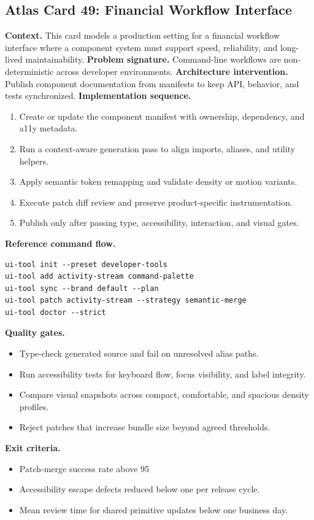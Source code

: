 \subsection*{Atlas Card 49: Financial Workflow Interface}
\textbf{Context.} This card models a production setting for a financial workflow interface where a component system must support speed, reliability, and long-lived maintainability.
\textbf{Problem signature.} Command-line workflows are non-deterministic across developer environments.
\textbf{Architecture intervention.} Publish component documentation from manifests to keep API, behavior, and tests synchronized.
\textbf{Implementation sequence.}
\begin{enumerate}[leftmargin=*, itemsep=0.28em]
  \item Create or update the component manifest with ownership, dependency, and a11y metadata.
  \item Run a context-aware generation pass to align imports, aliases, and utility helpers.
  \item Apply semantic token remapping and validate density or motion variants.
  \item Execute patch diff review and preserve product-specific instrumentation.
  \item Publish only after passing type, accessibility, interaction, and visual gates.
\end{enumerate}
\textbf{Reference command flow.}
\begin{verbatim}
ui-tool init --preset developer-tools
ui-tool add activity-stream command-palette
ui-tool sync --brand default --plan
ui-tool patch activity-stream --strategy semantic-merge
ui-tool doctor --strict
\end{verbatim}
\textbf{Quality gates.}
\begin{itemize}[leftmargin=*, itemsep=0.24em]
  \item Type-check generated source and fail on unresolved alias paths.
  \item Run accessibility tests for keyboard flow, focus visibility, and label integrity.
  \item Compare visual snapshots across compact, comfortable, and spacious density profiles.
  \item Reject patches that increase bundle size beyond agreed thresholds.
\end{itemize}
\textbf{Exit criteria.}
\begin{itemize}[leftmargin=*, itemsep=0.24em]
  \item Patch-merge success rate above 95%
  \item Accessibility escape defects reduced below one per release cycle.
  \item Mean review time for shared primitive updates below one business day.
\end{itemize}
